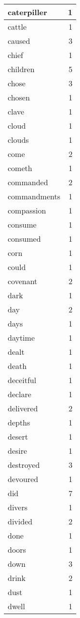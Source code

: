 \begin{center}
\begin{longtable}{l|r}
caterpiller & 1\\ \hline 
cattle & 1\\ \hline 
caused & 3\\ \hline 
chief & 1\\ \hline 
children & 5\\ \hline 
chose & 3\\ \hline 
chosen & 1\\ \hline 
clave & 1\\ \hline 
cloud & 1\\ \hline 
clouds & 1\\ \hline 
come & 2\\ \hline 
cometh & 1\\ \hline 
commanded & 2\\ \hline 
commandments & 1\\ \hline 
compassion & 1\\ \hline 
consume & 1\\ \hline 
consumed & 1\\ \hline 
corn & 1\\ \hline 
could & 1\\ \hline 
covenant & 2\\ \hline 
dark & 1\\ \hline 
day & 2\\ \hline 
days & 1\\ \hline 
daytime & 1\\ \hline 
dealt & 1\\ \hline 
death & 1\\ \hline 
deceitful & 1\\ \hline 
declare & 1\\ \hline 
delivered & 2\\ \hline 
depths & 1\\ \hline 
desert & 1\\ \hline 
desire & 1\\ \hline 
destroyed & 3\\ \hline 
devoured & 1\\ \hline 
did & 7\\ \hline 
divers & 1\\ \hline 
divided & 2\\ \hline 
done & 1\\ \hline 
doors & 1\\ \hline 
down & 3\\ \hline 
drink & 2\\ \hline 
dust & 1\\ \hline 
dwell & 1\\ \hline 

\end{longtable}
\end{center}
